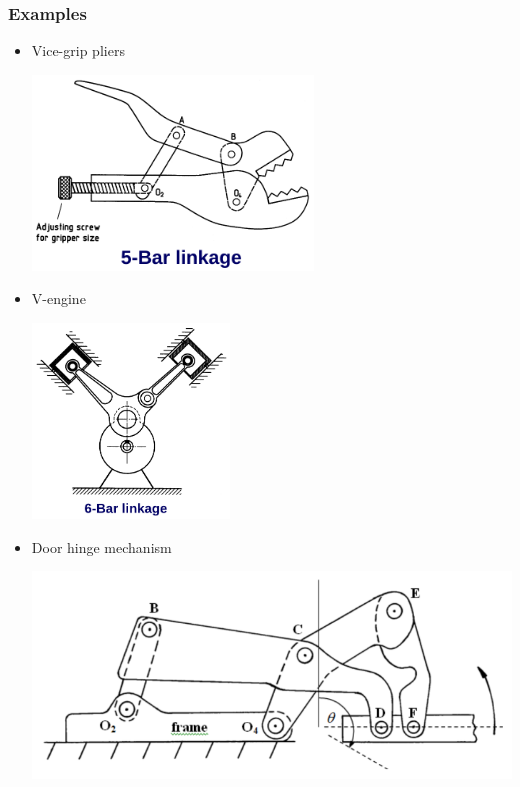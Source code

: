 \documentclass[11pt]{article}
\begin{document}
\subsubsection{Examples}
\label{sec:org7eb8ddc}
\begin{itemize}
\item Vice-grip pliers
\begin{center}
\includegraphics[height=14em]{./images/vice-grip-pliers-kinematic-diagram.png}
\end{center}
\item V-engine
\begin{center}
\includegraphics[height=14em]{./images/v-engine-kinematic-diagram.png}
\end{center}
\item Door hinge mechanism
\begin{center}
\includegraphics[width=.9\linewidth]{./images/door-hinge-kinematic-diagram.png}
\end{center}
\end{itemize}
\end{document}
